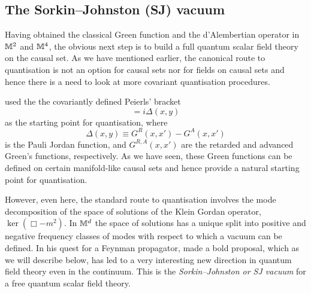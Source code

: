 \subsection{The Sorkin--Johnston (SJ) vacuum} 
\label{ssec:SJ} 
 
Having obtained the classical Green function and the d'Alembertian operator in $\mathbb M^2$ and $\mathbb M^4$, the obvious next step
is to build a full quantum scalar field theory on the causal set. As we have mentioned earlier, the
canonical route to quantisation is not an option for causal sets nor for fields on causal sets and hence there is a need to look at more covariant
quantisation procedures. 

\cite{johnstontwo,johnstonthesis}  used the the covariantly defined {Peierls'}   bracket 
\begin{equation} 
[\hP(x),\hP(y)] = i\Delta(x,y) 
\end{equation} 
as the starting
point for quantisation, where 
\begin{equation} 
\Delta(x,y) \equiv G^R(x,x')-G^A(x,x') 
\end{equation}
is the Pauli Jordan function, and $G^{R,A}(x,x')$ are the retarded and advanced Green's
functions, respectively.  As we have seen,  these Green functions  can be defined on certain manifold-like causal sets and
hence provide a 
natural starting point for quantisation. 

However, even  here, the standard route to quantisation involves the
mode decomposition of the space of solutions of the Klein Gordan operator,  $\ker(\Box-m^2)$.  In $\mathbb M^d$ the space of
solutions has a unique  split  into positive
and negative frequency classes of modes  with respect to which a vacuum can be defined.  
In his quest for a Feynman propagator, \cite{johnstontwo} made a bold proposal, which as we
will describe below,  has led  to a very interesting new direction in quantum field theory  even in the
continuum. This is  the  \emph{Sorkin--Johnston or SJ vacuum} for a free quantum scalar field theory. 

